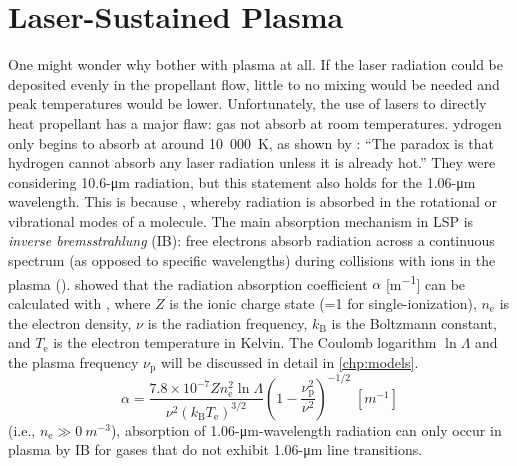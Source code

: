     \section{Laser-Sustained Plasma} \label{sec:background_lsp}
        One might wonder why bother with plasma at all. If the laser radiation could be deposited evenly in the propellant flow, little to no mixing would be needed and peak temperatures would be lower. Unfortunately, the use of lasers to directly heat  propellant has a major flaw:  gas  not absorb  at room temperatures. ydrogen only begins to absorb  at around 10~000~K, as shown by \textcite{glumbConceptsStatusLasersupported1984}: ``The paradox is that hydrogen cannot absorb any laser radiation unless it is already hot.'' They were considering 10.6-\unit{\um} radiation, but this statement also holds for the 1.06-\unit{\um} wavelength. This is because , whereby radiation is absorbed in the rotational or vibrational modes of a molecule. The main absorption mechanism in LSP is \emph{inverse bremsstrahlung} (IB): free electrons absorb radiation across a continuous spectrum (as opposed to specific wavelengths) during collisions with ions in the plasma (\textcite{keeferLaserSustainedPlasmas1989}). \textcite{johnstonCorrectValuesHighfrequency1973} showed that the radiation absorption coefficient $\alpha$ [\unit{m^{-1}}] can be calculated with , where $Z$ is the ionic charge state (=1 for single-ionization), $n_\mathrm{e}$ is the electron density, $\nu$ is the radiation frequency, $k_\mathrm{B}$ is the Boltzmann constant, and $T_\mathrm{e}$ is the electron temperature in Kelvin. The Coulomb logarithm $\ln{\Lambda}$ and the plasma frequency $\nu_\mathrm{p}$ will be discussed in detail in \autoref{chp:models}.
        \newcommand{\ibalphaeq}{
            \alpha = \frac{7.8\times 10^{-7}Zn_\mathrm{e}^2\ln{\Lambda}}{\nu^2(k_\mathrm{B}T_\mathrm{e})^{3/2}} \left(1-\frac{\nu_\mathrm{p}^2}{\nu^2}\right)^{-1/2}\;[\unit{m^{-1}}]
        }
        \begin{equation}
            \ibalphaeq \label{eq:ib_absorption}
        \end{equation}
         (i.e., $n_\mathrm{e} \gg \qty{0}{m^{-3}}$), absorption of 1.06-\unit{\um}-wavelength radiation can only occur in plasma by IB for gases that do not exhibit 1.06-\unit{\um} line transitions.

